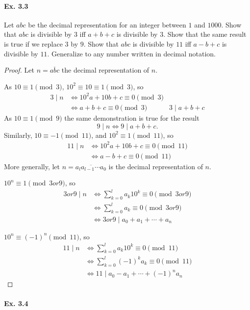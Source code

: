 \documentclass[11pt,a4paper]{article}
\begin{document}
{{\it \paragraph{Ex. 3.3}
Let $abc$ be the decimal representation for an integer between $1$ and $1000$. Show that $abc$ is divisible by $3$ iff $a + b + c$ is divisible by $3$. Show that the same result is true if we replace $3$ by $9$. Show that $abc$ is divisible by $11$ iff $a - b + c$ is divisible by $11$.  Generalize to any number written in decimal notation.
}

\begin{proof}
Let $n = \overline{abc}$ the decimal representation of $n$. 

As $10 \equiv 1 \pmod 3$, $10^2 \equiv 10 \equiv 1 \pmod 3$, so
\begin{align*}
3 \mid n &\iff 10^2 a + 10 b + c \equiv 0 \pmod 3\\ 
&\iff a+b+c \equiv 0 \pmod 3
& 3 \mid a+b+ c
\end{align*}
As $10 \equiv 1 \pmod 9$ the same demonstration is true for the result
$$9 \mid n \iff 9 \mid a+b+c.$$
Similarly, $10 \equiv -1 \pmod {11}$, and $10^2 \equiv 1 \pmod {11}$, so
\begin{align*}
11 \mid n &\iff 10^2 a + 10 b + c \equiv 0 \pmod {11}\\ 
&\iff a-b+c \equiv 0 \pmod {11}
\end{align*}
More generally, let $n = \overline{a_la_{l-1}\cdots a_0}$ is the decimal representation of $n$. 

$10^n \equiv 1 \pmod {3 or 9}$, so
\begin{align*}
3 or 9 \mid n &\iff \sum_{k=0}^l a_k 10^k \equiv 0 \pmod {3 or 9}\\
&\iff \sum_{k=0}^l a_k \equiv 0 \pmod {3 or 9}\\
&\iff 3 or 9 \mid a_0+a_1+\cdots +a_n
\end{align*}

$10^n \equiv (-1)^n \pmod {11}$, so
\begin{align*}
11 \mid n &\iff \sum_{k=0}^l a_k 10^k \equiv 0 \pmod {11}\\
&\iff \sum_{k=0}^l (-1)^{k} a_k \equiv 0 \pmod {11}\\
&\iff 11 \mid a_0-a_1+\cdots +(-1)^n a_n
\end{align*}
\end{proof}

\paragraph{Ex. 3.4}

}
\end{document}
